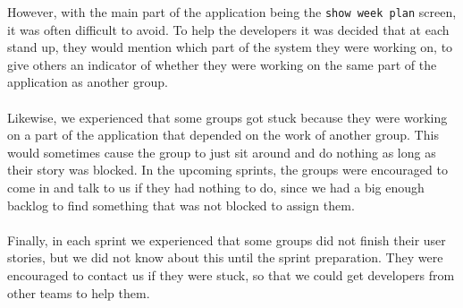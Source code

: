 However, with the main part of the application being the \texttt{show week plan} screen, it was often difficult to avoid. 
To help the developers it was decided that at each stand up, they would mention which part of the system they were working on, to give others an indicator of whether they were working on the same part of the application as another group.
\\\\
Likewise, we experienced that some groups got stuck because they were working on a part of the application that depended on the work of another group.
This would sometimes cause the group to just sit around and do nothing as long as their story was blocked.
In the upcoming sprints, the groups were encouraged to come in and talk to us if they had nothing to do, since we had a big enough backlog to find something that was not blocked to assign them.
\\\\
Finally, in each sprint we experienced that some groups did not finish their user stories, but we did not know about this until the sprint preparation.
They were encouraged to contact us if they were stuck, so that we could get developers from other teams to help them.
